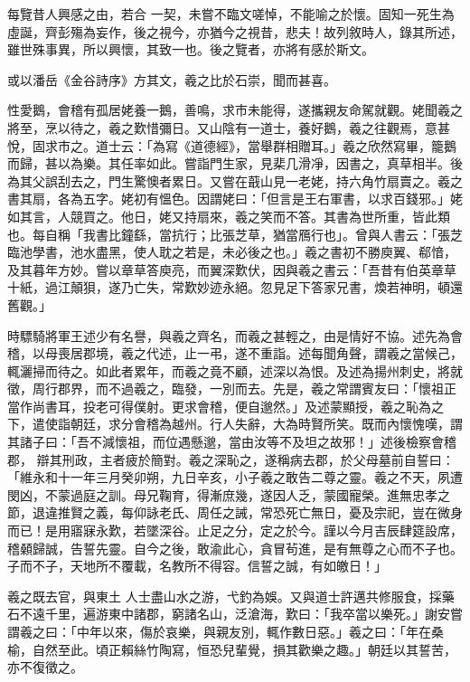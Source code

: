 \begin{pinyinscope}
 每覽昔人興感之由，若合
 一契，未嘗不臨文嗟悼，不能喻之於懷。固知一死生為虛誕，齊彭殤為妄作，後之視今，亦猶今之視昔，悲夫！故列敘時人，錄其所述，雖世殊事異，所以興懷，其致一也。後之覽者，亦將有感於斯文。



 或以潘岳《金谷詩序》方其文，羲之比於石崇，聞而甚喜。



 性愛鵝，會稽有孤居姥養一鵝，善鳴，求市未能得，遂攜親友命駕就觀。姥聞羲之將至，烹以待之，羲之歎惜彌日。又山陰有一道士，養好鵝，羲之往觀焉，意甚悅，固求市之。道士云：「為寫《道德經》，當舉群相贈耳。」羲之欣然寫畢，籠鵝而歸，甚以為樂。其任率如此。嘗詣門生家，見棐几滑凈，因書之，真草相半。後
 為其父誤刮去之，門生驚懊者累日。又嘗在蕺山見一老姥，持六角竹扇賣之。羲之書其扇，各為五字。姥初有慍色。因謂姥曰：「但言是王右軍書，以求百錢邪。」姥如其言，人競買之。他日，姥又持扇來，羲之笑而不答。其書為世所重，皆此類也。每自稱「我書比鐘繇，當抗行；比張芝草，猶當鴈行也」。曾與人書云：「張芝臨池學書，池水盡黑，使人耽之若是，未必後之也。」羲之書初不勝庾翼、郗愔，及其暮年方妙。嘗以章草答庾亮，而翼深歎伏，因與羲之書云：「吾昔有伯英章草十紙，過江顛狽，遂乃亡失，常歎妙迹永絕。忽見足下答家兄書，煥若神明，頓還舊觀。」



 時驃騎將軍王述少有名譽，與羲之齊名，而羲之甚輕之，由是情好不協。述先為會稽，以母喪居郡境，羲之代述，止一弔，遂不重詣。述每聞角聲，謂羲之當候己，輒灑掃而待之。如此者累年，而羲之竟不顧，述深以為恨。及述為揚州刺史，將就徵，周行郡界，而不過羲之，臨發，一別而去。先是，羲之常謂賓友曰：「懷祖正當作尚書耳，投老可得僕射。更求會稽，便自邈然。」及述蒙顯授，羲之恥為之下，遣使詣朝廷，求分會稽為越州。行人失辭，大為時賢所笑。既而內懷愧嘆，謂其諸子曰：「吾不減懷祖，而位遇懸邈，當由汝等不及坦之故邪！」述後檢察會稽郡，
 辯其刑政，主者疲於簡對。羲之深恥之，遂稱病去郡，於父母墓前自誓曰：「維永和十一年三月癸卯朔，九日辛亥，小子羲之敢告二尊之靈。羲之不天，夙遭閔凶，不蒙過庭之訓。母兄鞠育，得漸庶幾，遂因人乏，蒙國寵榮。進無忠孝之節，退違推賢之義，每仰詠老氏、周任之誡，常恐死亡無日，憂及宗祀，豈在微身而已！是用寤寐永歎，若墜深谷。止足之分，定之於今。謹以今月吉辰肆筵設席，稽顙歸誠，告誓先靈。自今之後，敢渝此心，貪冒茍進，是有無尊之心而不子也。子而不子，天地所不覆載，名教所不得容。信誓之誠，有如皦日！」



 羲之既去官，與東土
 人士盡山水之游，弋釣為娛。又與道士許邁共修服食，採藥石不遠千里，遍游東中諸郡，窮諸名山，泛滄海，歎曰：「我卒當以樂死。」謝安嘗謂羲之曰：「中年以來，傷於哀樂，與親友別，輒作數日惡。」羲之曰：「年在桑榆，自然至此。頃正賴絲竹陶寫，恒恐兒輩覺，損其歡樂之趣。」朝廷以其誓苦，亦不復徵之。




\end{pinyinscope}

